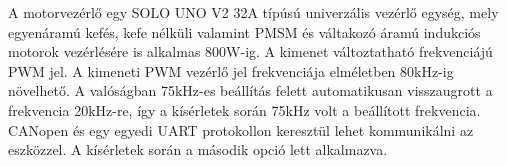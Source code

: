 A motorvezérlő egy SOLO UNO V2 32A típúsú univerzális vezérlő egység, mely egyenáramú kefés, kefe 
nélküli valamint PMSM és váltakozó áramú indukciós motorok vezérlésére is alkalmas 800W-ig. 
A kimenet változtatható frekvenciájú PWM jel. A kimeneti PWM vezérlő jel frekvenciája elméletben 80kHz-ig 
növelhető. A valóságban 75kHz-es beállítás felett automatikusan visszaugrott a frekvencia 20kHz-re, így 
a kísérletek során 75kHz volt a beállított frekvencia. CANopen és egy egyedi UART 
protokollon keresztül lehet kommunikálni az eszközzel. A kísérletek során a második opció lett alkalmazva.


